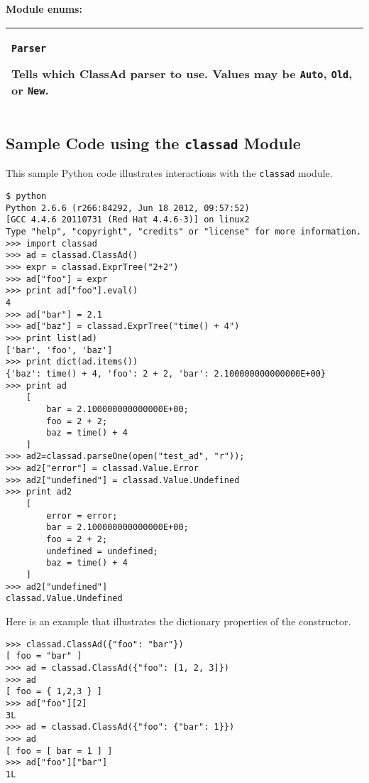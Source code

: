 \textbf{Module enums:}
\begin{flushleft}
\begin{tabular}{|p{16cm}|} \hline

\texttt{Parser}

Tells which ClassAd parser to use.
Values may be
\texttt{Auto},
\texttt{Old},
or \texttt{New}.

\\ \hline

\end{tabular}
\end{flushleft}

\subsection{\label{Python-ClassAd-Example} Sample Code using the \texttt{classad} Module}
This sample Python code illustrates interactions with the \texttt{classad} module. 

\footnotesize
\begin{verbatim}
$ python
Python 2.6.6 (r266:84292, Jun 18 2012, 09:57:52) 
[GCC 4.4.6 20110731 (Red Hat 4.4.6-3)] on linux2
Type "help", "copyright", "credits" or "license" for more information.
>>> import classad
>>> ad = classad.ClassAd()
>>> expr = classad.ExprTree("2+2")
>>> ad["foo"] = expr
>>> print ad["foo"].eval()
4
>>> ad["bar"] = 2.1
>>> ad["baz"] = classad.ExprTree("time() + 4")
>>> print list(ad)
['bar', 'foo', 'baz']
>>> print dict(ad.items())
{'baz': time() + 4, 'foo': 2 + 2, 'bar': 2.100000000000000E+00}
>>> print ad
    [
        bar = 2.100000000000000E+00; 
        foo = 2 + 2; 
        baz = time() + 4
    ]
>>> ad2=classad.parseOne(open("test_ad", "r"));
>>> ad2["error"] = classad.Value.Error
>>> ad2["undefined"] = classad.Value.Undefined
>>> print ad2
    [
        error = error; 
        bar = 2.100000000000000E+00; 
        foo = 2 + 2; 
        undefined = undefined; 
        baz = time() + 4
    ]
>>> ad2["undefined"]
classad.Value.Undefined

\end{verbatim}
\normalsize

Here is an example that illustrates the dictionary properties of
the constructor.
\footnotesize
\begin{verbatim}
>>> classad.ClassAd({"foo": "bar"})
[ foo = "bar" ]
>>> ad = classad.ClassAd({"foo": [1, 2, 3]})
>>> ad
[ foo = { 1,2,3 } ]
>>> ad["foo"][2]
3L
>>> ad = classad.ClassAd({"foo": {"bar": 1}})
>>> ad
[ foo = [ bar = 1 ] ]
>>> ad["foo"]["bar"]
1L

\end{verbatim}
\normalsize

